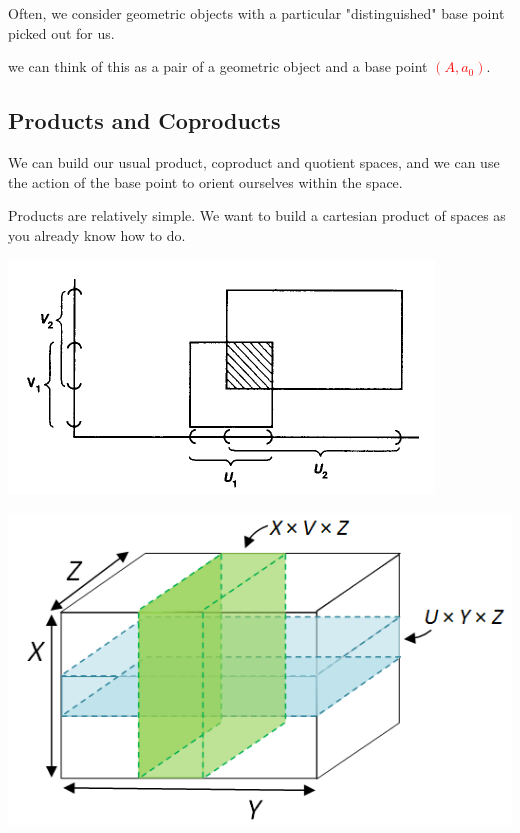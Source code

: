 \documentclass[tikz]{beamer}
\newcommand{\mred}[1]{\textcolor{red}{$#1$}}
\theoremstyle{definition}
\begin{document}
\frame
{
Often, we consider geometric objects with a particular "distinguished" base point picked out for us. 

\begin{center}
\end{center}

we can think of this as a pair of a geometric object and a base point \mred{(A, a_0)}.
}

\subsection{Products and Coproducts}

\frame
{
	We can build our usual product, coproduct and quotient spaces, and we can use the action of the base point to orient ourselves within the space.
}

\frame
{
	Products are relatively simple. We want to build a cartesian product of spaces as you already know how to do. 
	
	\begin{center}
		\includegraphics[scale=0.3]{product}
	\end{center}
	
	\begin{center}
		\includegraphics[scale=0.3]{product3}
	\end{center}
}
\end{document}
